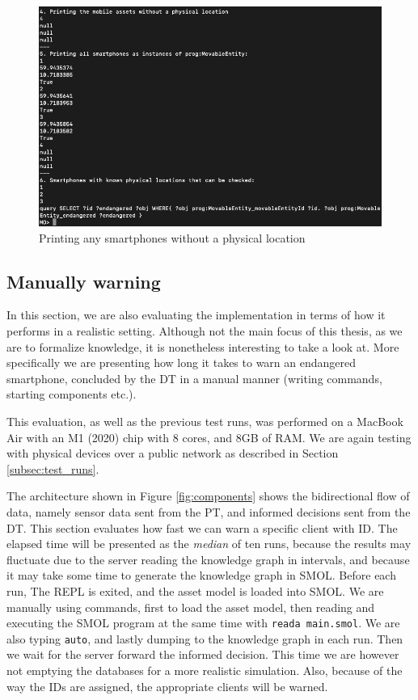 \documentclass{article}
\begin{document}
\begin{figure}[H]
    \centering
    \includegraphics[scale=0.40]{graphics/manually_adding_smartphone.png}
    \caption{Printing any smartphones without a physical location}
    \label{fig:manually_adding_smartphone}
\end{figure}

\subsection{Manually warning}\label{subsec:time_to_warn}
In this section, we are also evaluating the implementation in terms of how it performs in a realistic setting. Although not the main focus of this thesis, as we are to formalize knowledge, it is nonetheless interesting to take a look at. More specifically we are presenting how long it takes to warn an endangered smartphone, concluded by the DT in a manual manner (writing commands, starting components etc.).  

This evaluation, as well as the previous test runs, was performed on a MacBook Air with an M1 (2020) chip with 8 cores, and 8GB of RAM. We are again testing with physical devices over a public network as described in Section \ref{subsec:test_runs}.

The architecture shown in Figure \ref{fig:components} shows the bidirectional flow of data, namely sensor data sent from the PT, and informed decisions sent from the DT. This section evaluates how fast we can warn a specific client with ID. The elapsed time will be presented as the \emph{median} of ten runs, because the results may fluctuate due to the server reading the knowledge graph in intervals, and because it may take some time to generate the knowledge graph in SMOL. Before each run, The REPL is exited, and the asset model is loaded into SMOL. We are manually using commands, first to load the asset model, then reading and executing the SMOL program at the same time with \verb|reada main.smol|. We are also typing \verb|auto|, and lastly dumping to the knowledge graph in each run. Then we wait for the server forward the informed decision. This time we are however not emptying the databases for a more realistic simulation. Also, because of the way the IDs are assigned, the appropriate clients will be warned.
\end{document}
